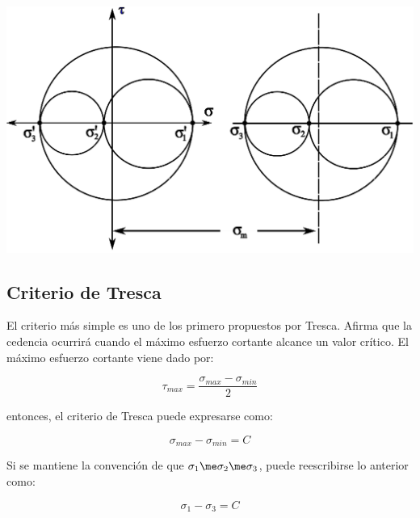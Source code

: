 \begin{center}
\includegraphics[scale=0.75]{src/ch2/circulos_mohr_svg.eps}
\label{fig:circulos_mohr}
\end{center}



\subsection{Criterio de Tresca}

El criterio más simple es uno de los primero propuestos por Tresca. Afirma que la cedencia 
ocurrirá cuando el máximo esfuerzo cortante alcance un valor crítico. El máximo esfuerzo 
cortante viene dado por:

\begin{equation}
\tau_{max} = \frac{\sigma_{max}-\sigma_{min}}{2}
\end{equation}

entonces, el criterio de Tresca puede expresarse como:

\begin{equation}
\sigma_{max} - \sigma_{min} = C
\end{equation}

Si se mantiene la convención de que $ \sigma_1 \me \sigma_2 \me \sigma_3 $, puede reescribirse lo anterior como:

\begin{equation}\label{eq:ec1}
\sigma_1 - \sigma_3 = C
\end{equation}


